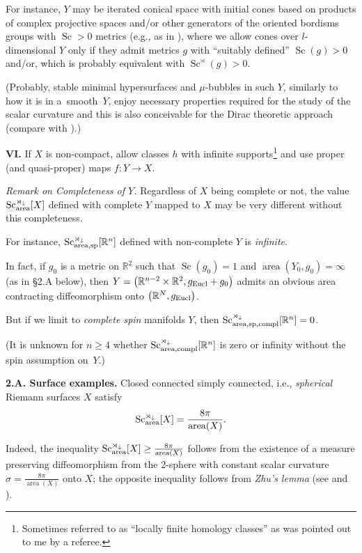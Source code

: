 \documentclass[10pt,a4paper]{amsart}
\numberwithin{equation}{section}
\begin{document}
For instance, $Y$ may be iterated conical space with initial cones based on products of complex projective spaces and/or other generators of the oriented bordisms groups with $\operatorname{Sc}>0$ metrics (e.g., as in \cite{GL1983}), where we allow cones over $l$-dimensional $Y$ only if they admit metrics $g$ with ``suitably defined'' $\operatorname{Sc}(g)>0$ and/or, which is probably equivalent with $\operatorname{Sc}^\rtimes(g) >0$.

(Probably, stable minimal hypersurfaces and $\mu$-bubbles in such $Y$, similarly to how it is in a~smooth~$Y$, enjoy necessary properties required for the study of the scalar curvature
and this is also conceivable for the Dirac theoretic approach (compare with \cite{BR2021}).)

 \textbf {VI.} If $X$ is non-compact, allow classes $h$ with infinite supports\footnote{Sometimes referred to as ``locally finite homology classes'' as was pointed out to me by a referee.} and use proper (and quasi-proper) maps $f\colon Y\to X$.

{\it Remark on Completeness of $Y$.} Regardless of $X$ being complete or not, the value $\operatorname{Sc}_{\rm area} ^{\rtimes_\downarrow}[X]$ defined with complete $Y$ mapped to $X$ may be very different without this completeness.

For instance, $\operatorname{Sc}_{\rm area,sp} ^{\rtimes_\downarrow}[\mathbb R^n]$ defined with non-complete $Y$ is {\it infinite}.

 In fact, if $g_0$ is a metric on $\mathbb R^2$ such that $\operatorname{Sc}(g_0)=1$ and
 $\operatorname{area}(Y_0,g_0)=\infty$ (as in \S2.A below), then $Y=\bigl(\mathbb R^{n-2}\times \mathbb R^2, g_{\rm Eucl}+g_0\bigr)$ admits an obvious area contracting diffeomorphism onto $\bigl(\mathbb R^N,g_{\rm Eucl}\bigr)$.


But if we limit to {\it complete spin} manifolds $Y$, then
$\operatorname{Sc}_{\rm area,sp,compl} ^{\rtimes_\downarrow}[\mathbb R^n]=0$.

(It is unknown for $n\geq 4$ whether $\operatorname{Sc}_{\rm area,compl} ^{\rtimes_\downarrow}[\mathbb R^n]$ is zero or infinity without the spin assumption on~$Y$.)

\textbf{2.A. Surface examples.}
 Closed connected simply connected, i.e., {\it spherical} Riemann surfaces $X$ satisfy
\[
\operatorname{Sc}_{\rm area}^{\rtimes_\downarrow}[X]=\frac {8\pi} {\operatorname{area}(X)}.
\]

Indeed, the inequality $\operatorname{Sc}_{\rm area}^{\rtimes_\downarrow}[X]\geq\frac {8\pi} {\operatorname{area}(X)}$
follows from the existence of a measure preserving diffeomorphism from the 2-sphere with constant scalar curvature $\sigma=\frac{8\pi}{\operatorname{area}(X)}$ onto $X$;
 the opposite inequality follows from {\it Zhu's lemma} (see \cite{Zhu2019} and \cite[Section~2.8]{Gr2021}).
\end{document}
